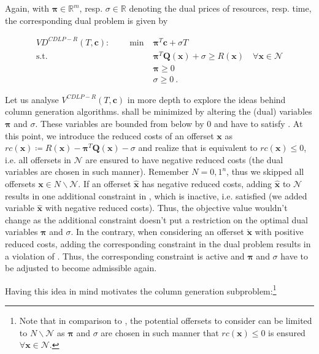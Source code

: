 Again, with $\boldsymbol{\pi} \in \mathbb{R}^m$, resp. $\sigma \in \mathbb{R}$ denoting the dual prices of resources, resp. time, the corresponding dual problem is given by

\begin{align}
VD^{CDLP-R}(T, \boldsymbol{c}): \qquad \min &\boldsymbol{\pi}^T \boldsymbol{c} + \sigma T\label{eq-CDLPr}\\
\text{s.t.} &\boldsymbol{\pi}^T \boldsymbol{Q}(\boldsymbol{x}) + \sigma \geq R(\boldsymbol{x}) \quad \forall \boldsymbol{x}\in \mathcal{N}\label{eq-CDLPr-col}\\
& \boldsymbol{\pi} \geq 0\\
& \sigma \geq 0 ~.
\end{align}


Let us analyse $V^{CDLP-R}(T, \boldsymbol{c})$ in more depth to explore the ideas behind column generation algorithms.  shall be minimized by altering the (dual) variables $\boldsymbol{\pi}$ and $\sigma$. These variables are bounded from below by $0$ and have to satisfy . At this point, we introduce the reduced costs of an offerset $\boldsymbol{x}$ as $rc(\boldsymbol{x}) \coloneqq R(\boldsymbol{x}) - \boldsymbol{\pi}^T \boldsymbol{Q}(\boldsymbol{x}) - \sigma$ and realize that  is equivalent to $rc(\boldsymbol{x}) \leq 0$, i.e. all offersets in $\mathcal{N}$ are ensured to have negative reduced costs (the dual variables are chosen in such manner). Remember $N = {0, 1}^n$, thus we skipped all offersets $\boldsymbol{x} \in N \backslash \mathcal{N}$. If an offerset $\hat{\boldsymbol{x}}$ has negative reduced costs, adding $\hat{\boldsymbol{x}}$ to $\mathcal{N}$ results in one additional constraint in , which is inactive, i.e. satisfied (we added variable $\hat{\boldsymbol{x}}$ with negative reduced costs). Thus, the objective value wouldn't change as the additional constraint doesn't put a restriction on the optimal dual variables $\boldsymbol{\pi}$ and $\sigma$. In the contrary, when considering an offerset $\check{\boldsymbol{x}}$ with positive reduced costs, adding the corresponding constraint in the dual problem results in a violation of . Thus, the corresponding constraint is active and $\boldsymbol{\pi}$ and $\sigma$ have to be adjusted to become admissible again. 

Having this idea in mind motivates the column generation subproblem:\footnote{Note that in comparison to \cite{Bront.2009}, the potential offersets to consider can be limited to $N \backslash \mathcal{N}$ as $\boldsymbol{\pi}$ and $\sigma$ are chosen in such manner that $rc(\boldsymbol{x}) \leq 0$ is ensured $\forall \boldsymbol{x}\in \mathcal{N}$.}

